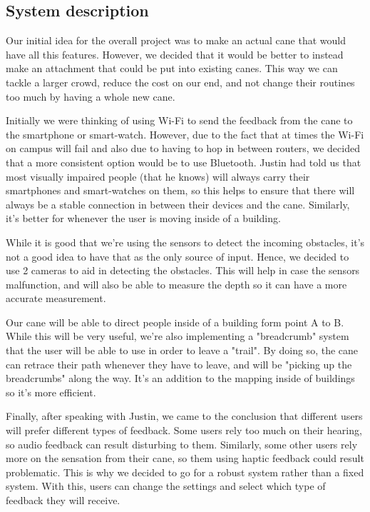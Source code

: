 \documentclass[letterpaper,12pt]{article}
\begin{document}
\subsection{System description}%
Our initial idea for the overall project was to make an actual cane that would have all this features. However, we decided that it would be better to instead make an attachment that could be put into existing canes. This way we can tackle a larger crowd, reduce the cost on our end, and not change their routines too much by having a whole new cane.\par

Initially we were thinking of using Wi-Fi to send the feedback from the cane to the smartphone or smart-watch. However, due to the fact that at times the Wi-Fi on campus will fail and also due to having to hop in between routers, we decided that a more consistent option would be to use Bluetooth. Justin had told us that most visually impaired people (that he knows) will always carry their smartphones and smart-watches on them, so this helps to ensure that there will always be a stable connection in between their devices and the cane. Similarly, it's better for whenever the user is moving inside of a building.\par

While it is good that we're using the sensors to detect the incoming obstacles, it's not a good idea to have that as the only source of input. Hence, we decided to use 2 cameras to aid in detecting the obstacles. This will help in case the sensors malfunction, and will also be able to measure the depth so it can have a more accurate measurement.\par

Our cane will be able to direct people inside of a building form point A to B. While this will be very useful, we're also implementing a "breadcrumb" system that the user will be able to use in order to leave a "trail". By doing so, the cane can retrace their path whenever they have to leave, and will be "picking up the breadcrumbs" along the way. It's an addition to the mapping inside of buildings so it's more efficient.\par

Finally, after speaking with Justin, we came to the conclusion that different users will prefer different types of feedback. Some users rely too much on their hearing, so audio feedback can result disturbing to them. Similarly, some other users rely more on the sensation from their cane, so them using haptic feedback could result problematic. This is why we decided to go for a robust system rather than a fixed system. With this, users can change the settings and select which type of feedback they will receive.
\end{document}
